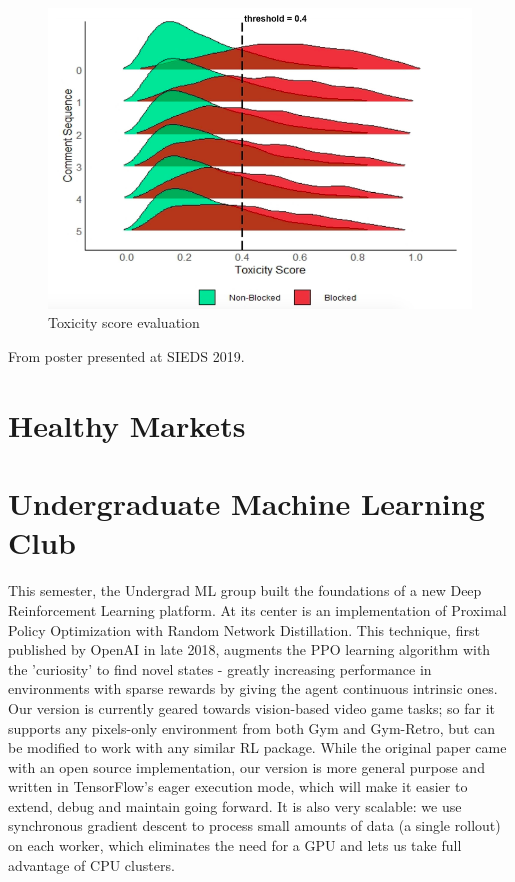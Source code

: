 \begin{figure}[!hbtp]
\includegraphics[width=\textwidth]{images/wiki2}
\caption{Toxicity score evaluation}
\end{figure}

From poster presented at SIEDS 2019.

\section{Healthy Markets}
\label{sec:hmt}

\section{Undergraduate Machine Learning Club}
\label{sec:mlc}
This semester, the Undergrad ML group built the foundations of a new Deep Reinforcement Learning platform. At its center is an implementation of Proximal Policy Optimization with Random Network Distillation. This technique, first published by OpenAI in late 2018, augments the PPO learning algorithm with the 'curiosity' to find novel states - greatly increasing performance in environments with sparse rewards by giving the agent continuous intrinsic ones. Our version is currently geared towards vision-based video game tasks; so far it supports any pixels-only environment from both Gym and Gym-Retro, but can be modified to work with any similar RL package. While the original paper came with an open source implementation, our version is more general purpose and written in TensorFlow's eager execution mode, which will make it easier to extend, debug and maintain going forward. It is also very scalable: we use synchronous gradient descent to process small amounts of data (a single rollout) on each worker, which eliminates the need for a GPU and lets us take full advantage of CPU clusters.

